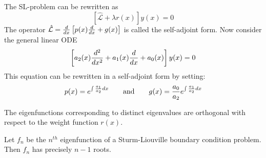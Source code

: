     \begin{definition}
		The SL-problem can be rewritten as \[\left[\hat{\mathcal{L}} + \lambda r(x)\right]y(x) = 0\]The operator $\hat{\mathcal{L}} = \frac{d}{dx}\left[p(x)\frac{d}{dx} + g(x)\right]$ is called the self-adjoint form. Now consider the general linear ODE
        \begin{equation}
			\left[a_2(x)\frac{d^{2} }{d x ^{2}} + a_1(x)\frac{d}{dx} + a_0(x)\right]y(x) = 0
		\end{equation}
        This equation can be rewritten in a self-adjoint form by setting:
        \begin{equation}
			p(x) = e^{\int\frac{a_1}{a_2}dx}\qquad\text{and}\qquad g(x) = \stylefrac{a_0}{a_2}e^{\int\frac{a_1}{a_2}dx}
		\end{equation}
	\end{definition}
    
    \begin{property}
		The eigenfunctions corresponding to distinct eigenvalues are orthogonal with respect to the weight function $r(x)$.
	\end{property}

	\begin{theorem}
		Let $f_n$ be the $n^{th}$ eigenfunction of a Sturm-\newline Liouville boundary condition problem. Then $f_n$ has precisely $n-1$ roots.
	\end{theorem}